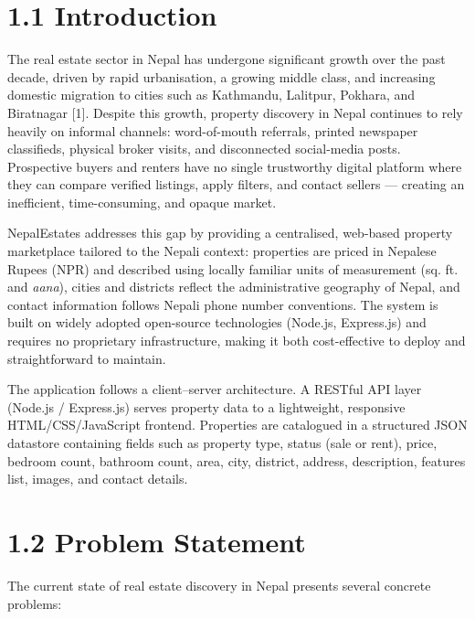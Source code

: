 \documentclass[12pt,a4paper]{report}
\begin{document}
\section{1.1 Introduction}
The real estate sector in Nepal has undergone significant growth over the past decade, driven by rapid urbanisation, a growing middle class, and increasing domestic migration to cities such as Kathmandu, Lalitpur, Pokhara, and Biratnagar [1]. Despite this growth, property discovery in Nepal continues to rely heavily on informal channels: word-of-mouth referrals, printed newspaper classifieds, physical broker visits, and disconnected social-media posts. Prospective buyers and renters have no single trustworthy digital platform where they can compare verified listings, apply filters, and contact sellers --- creating an inefficient, time-consuming, and opaque market.

NepalEstates addresses this gap by providing a centralised, web-based property marketplace tailored to the Nepali context: properties are priced in Nepalese Rupees (NPR) and described using locally familiar units of measurement (sq. ft. and \textit{aana}), cities and districts reflect the administrative geography of Nepal, and contact information follows Nepali phone number conventions. The system is built on widely adopted open-source technologies (Node.js, Express.js) and requires no proprietary infrastructure, making it both cost-effective to deploy and straightforward to maintain.

The application follows a client--server architecture. A RESTful API layer (Node.js / Express.js) serves property data to a lightweight, responsive HTML/CSS/JavaScript frontend. Properties are catalogued in a structured JSON datastore containing fields such as property type, status (sale or rent), price, bedroom count, bathroom count, area, city, district, address, description, features list, images, and contact details.

\section{1.2 Problem Statement}
The current state of real estate discovery in Nepal presents several concrete problems:
\end{document}
